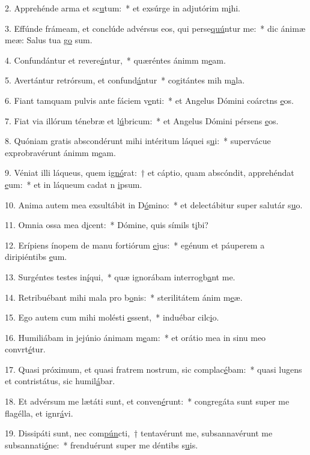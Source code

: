 2. Apprehénde arma et sc\uline{u}tum:~* et exsúrge in adjutórim m\uline{i}hi.\par 
3. Effúnde frámeam, et conclúde advérsus eos, qui perse\uline{quú}ntur me:~* dic ánimæ meæ: Salus tua g\uline{o} sum.\par 
4. Confundántur et revere\uline{á}ntur,~* quæréntes ánimm m\uline{e}am.\par 
5. Avertántur retrórsum, et confund\uline{á}ntur~* cogitántes mih m\uline{a}la.\par 
6. Fiant tamquam pulvis ante fáciem v\uline{e}nti:~* et Angelus Dómini coárctns \uline{e}os.\par 
7. Fiat via illórum ténebræ et l\uline{ú}bricum:~* et Angelus Dómini pérsens \uline{e}os.\par 
8. Quóniam gratis abscondérunt mihi intéritum láquei s\uline{u}i:~* supervácue exprobravérunt ánimm m\uline{e}am.\par 
9. Véniat illi láqueus, quem i\uline{gnó}rat:~† et cáptio, quam abscóndit, apprehéndat \uline{e}um:~* et in láqueum cadat n \uline{i}psum.\par 
10. Anima autem mea exsultábit in D\uline{ó}mino:~* et delectábitur super salutár s\uline{u}o.\par 
11. Omnia ossa mea d\uline{i}cent:~* Dómine, quis símils t\uline{i}bi?\par 
12. Erípiens ínopem de manu fortiórum \uline{e}jus:~* egénum et páuperem a diripiéntibs \uline{e}um.\par 
13. Surgéntes testes in\uline{í}qui,~* quæ ignorábam interrogb\uline{a}nt me.\par 
14. Retribuébant mihi mala pro b\uline{o}nis:~* sterilitátem ánim m\uline{e}æ.\par 
15. Ego autem cum mihi molésti \uline{e}ssent,~* induébar cilc\uline{i}o.\par 
16. Humiliábam in jejúnio ánimam m\uline{e}am:~* et orátio mea in sinu meo convrt\uline{é}tur.\par 
17. Quasi próximum, et quasi fratrem nostrum, sic complac\uline{é}bam:~* quasi lugens et contristátus, sic humil\uline{á}bar.\par 
18. Et advérsum me lætáti sunt, et conven\uline{é}runt:~* congregáta sunt super me flagélla, et ignr\uline{á}vi.\par 
19. Dissipáti sunt, nec com\uline{pún}cti,~† tentavérunt me, subsannavérunt me subsannati\uline{ó}ne:~* frenduérunt super me déntibs s\uline{u}is.\par 
